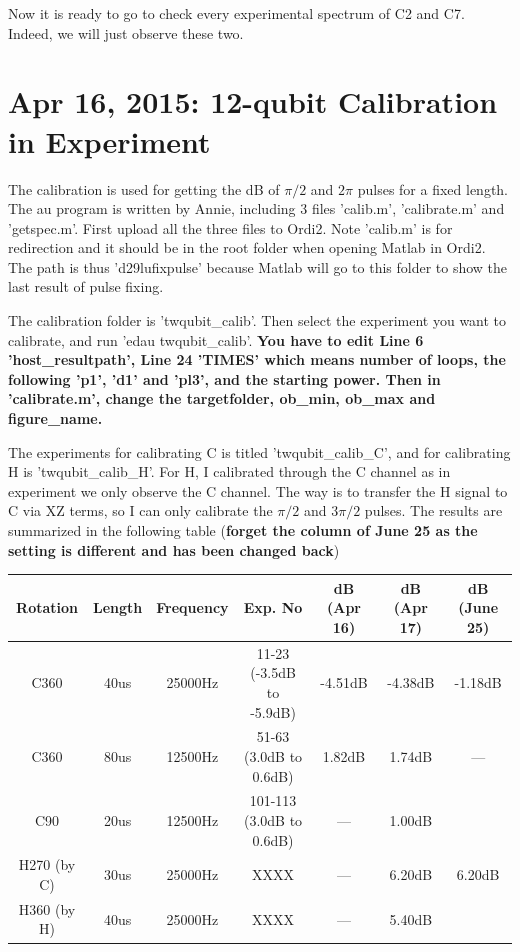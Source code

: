 Now it is ready to go to check every experimental spectrum of C2 and C7. Indeed, we will just observe these two.

\clearpage
\section{Apr 16, 2015: 12-qubit Calibration in Experiment}

The calibration is used for getting the dB of $\pi/2$ and $2\pi$ pulses for a fixed length. The au program is written by Annie, including 3 files 'calib.m', 'calibrate.m' and 'getspec.m'. First upload all the three files to Ordi2. Note 'calib.m' is for redirection and it should be in the root folder when opening Matlab in Ordi2. The path is thus '\dir d29lu\dir fixpulse\dir' because Matlab will go to this folder to show the last result of pulse fixing.

The calibration folder is 'twqubit\_calib'. Then select the experiment you want to calibrate, and run 'edau twqubit\_calib'. \textbf{You have to edit Line 6 'host\_resultpath', Line 24 'TIMES' which means number of loops, the following 'p1', 'd1' and 'pl3', and the starting power.  Then in 'calibrate.m', change the targetfolder, ob\_min, ob\_max and figure\_name. }

The experiments for calibrating C is titled 'twqubit\_calib\_C', and for calibrating H is 'twqubit\_calib\_H'. For H, I calibrated through the C channel as in experiment we only observe the C channel. The way is to transfer the H signal to C via XZ terms, so I can only calibrate the $\pi/2$ and $3\pi/2$ pulses. The results are summarized in the following table (\textbf{forget the column of June 25 as the setting is different and has been changed back})
\begin{table}[hbtp]
\begin{tabular} {c||c|c|c|c|c|c}
  \hline
  Rotation & Length & Frequency & Exp. No & dB (Apr 16) & dB (Apr 17) & dB (June 25)\\
  \hline
  C360 & 40us & 25000Hz & 11-23 (-3.5dB to -5.9dB) & -4.51dB & -4.38dB & -1.18dB\\
  C360 & 80us & 12500Hz & 51-63 (3.0dB to 0.6dB) & 1.82dB & 1.74dB & ---\\
  C90 & 20us & 12500Hz & 101-113 (3.0dB to 0.6dB) & --- & 1.00dB\\
  H270 (by C) & 30us & 25000Hz & XXXX & --- & 6.20dB & 6.20dB\\
  H360 (by H) & 40us & 25000Hz & XXXX & --- & 5.40dB\\
  \hline
\end{tabular}
\end{table}

